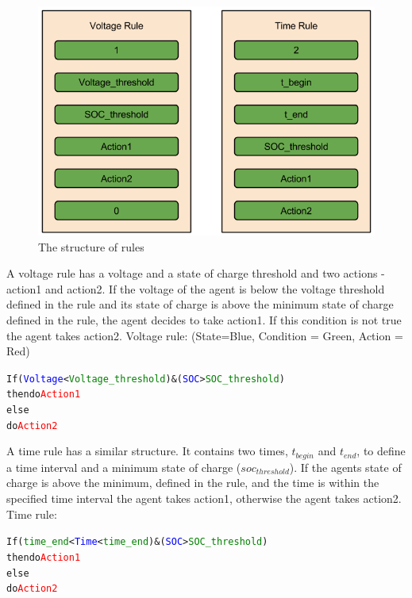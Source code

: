 \documentclass[a4paper]{article}
\begin{document}
\begin{figure}[!ht]
\includegraphics[width =\textwidth]{concept_rules_structure.png}
\caption{The structure of rules}
\label{rules_structure}
\end{figure}

A voltage rule has a voltage and a state of charge threshold and two actions - action1 and action2. 
If the voltage of the agent is below  the voltage threshold defined in the rule and its state of charge is above 
the minimum state of charge defined in the rule, the agent decides to take action1. If this condition is not true the 
agent takes action2. 
Voltage rule: (State=Blue, Condition = Green, Action = Red) \\ 
\begin{alltt}
If (\textcolor{blue}{Voltage} < \textcolor{green}{Voltage_threshold}) & (\textcolor{blue}{SOC} > \textcolor{green}{SOC_threshold})
    then do \textcolor{red}{Action1} 
else 
    do \textcolor{red}{Action2} 
\end{alltt}

A time rule has a similar structure. It contains two times, $t_{begin}$ and $t_{end}$, to define a time interval and 
a minimum state of charge ($soc_{threshold}$). If the agents state of charge is above the minimum, defined in the rule, 
and the time is within the specified time interval the agent takes action1, otherwise the agent takes action2. 
Time rule: \\ 
\begin{alltt}
If (\textcolor{green}{time_end} < \textcolor{blue}{Time} < \textcolor{green}{time_end}) & (\textcolor{blue}{SOC} > \textcolor{green}{SOC_threshold}) 
    then do \textcolor{red}{Action1} 
else 
    do \textcolor{red}{Action2} 
\end{alltt}
\newpage
\end{document}
